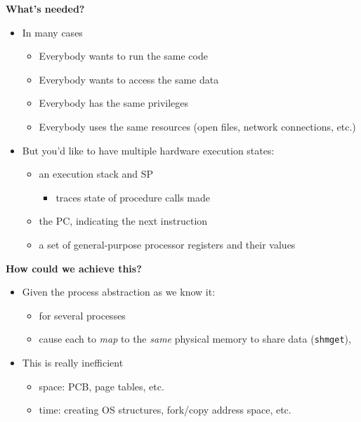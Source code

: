 \documentclass[11pt,a4paper]{article}
\begin{document}
\textbf{What's needed?}
\begin{itemize}
    \item In many cases
        \begin{itemize}
            \item Everybody wants to run the same code
            \item Everybody wants to access the same data
            \item Everybody has the same privileges
            \item Everybody uses the same resources (open files, network connections, etc.)
        \end{itemize}
    \item But you'd like to have multiple hardware execution states:
        \begin{itemize}
            \item an execution stack and SP
                \begin{itemize}
                    \item traces state of procedure calls made
                \end{itemize}
            \item the PC, indicating the next instruction
            \item a set of general-purpose processor registers and their values
        \end{itemize}
\end{itemize}

\textbf{How could we achieve this?}
\begin{itemize}
    \item Given the process abstraction as we know it:
        \begin{itemize}
            \item for several processes
            \item cause each to \emph{map} to the \emph{same} physical memory to share data
                (\texttt{shmget}),
        \end{itemize}
    \item This is really inefficient
        \begin{itemize}
            \item space: PCB, page tables, etc.
            \item time: creating OS structures, fork/copy address space, etc.
        \end{itemize}
\end{itemize}
\end{document}
